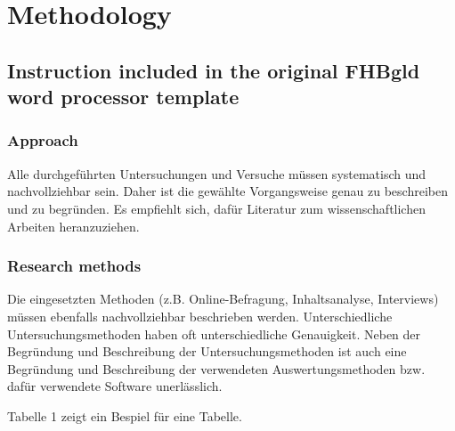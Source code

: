 \chapter{Methodology}

\section{Instruction included in the original FHBgld word processor template}
\subsection{Approach}
Alle durchgeführten Untersuchungen und Versuche müssen systematisch und nachvollziehbar sein. Daher ist die gewählte Vorgangsweise genau zu beschreiben und zu begründen. Es empfiehlt sich, dafür Literatur zum wissenschaftlichen Arbeiten heranzuziehen.

\subsection{Research methods}
Die eingesetzten Methoden (z.B. Online-Befragung, Inhaltsanalyse, Interviews) müssen ebenfalls nachvollziehbar beschrieben werden. 
Unterschiedliche Untersuchungsmethoden haben oft unterschiedliche Genauigkeit.
Neben der Begründung und Beschreibung der Untersuchungsmethoden ist auch eine Begründung und Beschreibung der verwendeten Auswertungsmethoden bzw. dafür verwendete Software unerlässlich.


Tabelle 1 zeigt ein Bespiel für eine Tabelle. 

